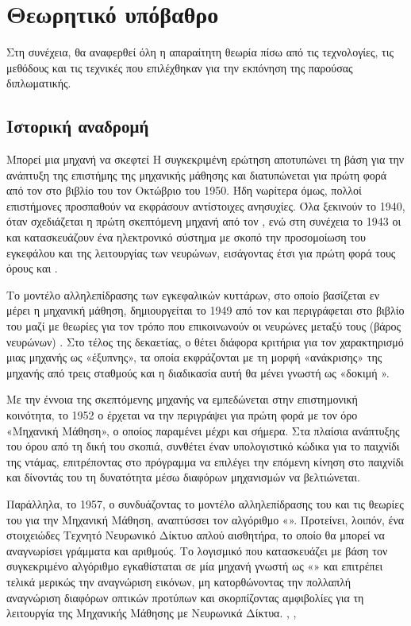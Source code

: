 \chapter{Θεωρητικό υπόβαθρο}

Στη συνέχεια, θα αναφερθεί όλη η απαραίτητη θεωρία πίσω από τις τεχνολογίες, τις μεθόδους και τις τεχνικές που επιλέχθηκαν για την εκπόνηση της παρούσας διπλωματικής.

\section{Ιστορική αναδρομή}	
Μπορεί μια μηχανή να σκεφτεί\en{;} Η συγκεκριμένη ερώτηση αποτυπώνει τη βάση για την ανάπτυξη της επιστήμης της μηχανικής μάθησης και διατυπώνεται για πρώτη φορά από τον  στο βιβλίο του  τον Οκτώβριο του 1950. \cite{3.1} Ήδη νωρίτερα όμως, πολλοί επιστήμονες προσπαθούν να εκφράσουν αντίστοιχες ανησυχίες. Όλα ξεκινούν το 1940, όταν σχεδιάζεται η πρώτη σκεπτόμενη μηχανή από τον , ενώ στη συνέχεια το 1943 οι  και  κατασκευάζουν ένα ηλεκτρονικό σύστημα με σκοπό την προσομοίωση του εγκεφάλου και της λειτουργίας των νευρώνων, εισάγοντας έτσι για πρώτη φορά τους όρους  και . \cite{3.2} 

Το μοντέλο αλληλεπίδρασης των εγκεφαλικών κυττάρων, στο οποίο βασίζεται εν μέρει η μηχανική μάθηση, δημιουργείται το 1949 από τον και περιγράφεται στο βιβλίο του  μαζί με θεωρίες για τον τρόπο που επικοινωνούν οι νευρώνες μεταξύ τους (βάρος νευρώνων) \cite{3.3}. Στο τέλος της δεκαετίας, ο  θέτει διάφορα κριτήρια για τον χαρακτηρισμό μιας μηχανής ως «έξυπνης», τα οποία εκφράζονται με τη μορφή «ανάκρισης» της μηχανής από τρεις σταθμούς και η διαδικασία αυτή θα μένει γνωστή ως «δοκιμή ». \cite{3.4}

Με την έννοια της σκεπτόμενης μηχανής να εμπεδώνεται στην επιστημονική κοινότητα, το 1952 ο  έρχεται να την περιγράψει για πρώτη φορά με τον όρο «Μηχανική Μάθηση», ο οποίος παραμένει μέχρι και σήμερα. Στα πλαίσια ανάπτυξης του όρου από  τη δική του σκοπιά, συνθέτει έναν υπολογιστικό κώδικα για το παιχνίδι της ντάμας, επιτρέποντας στο πρόγραμμα να επιλέγει την επόμενη κίνηση στο παιχνίδι και δίνοντάς του τη δυνατότητα μέσω διαφόρων μηχανισμών να βελτιώνεται. \cite{3.3} 

Παράλληλα, το 1957, ο  συνδυάζοντας το μοντέλο αλληλεπίδρασης του  και τις θεωρίες του  για την Μηχανική Μάθηση, αναπτύσσει τον αλγόριθμο «». Προτείνει, λοιπόν, ένα στοιχειώδες Τεχνητό Νευρωνικό Δίκτυο απλού αισθητήρα, το οποίο θα μπορεί να αναγνωρίσει γράμματα και αριθμούς. Το λογισμικό που κατασκευάζει με βάση τον συγκεκριμένο αλγόριθμο εγκαθίσταται σε μία μηχανή γνωστή ως «» και επιτρέπει τελικά μερικώς την αναγνώριση εικόνων, μη κατορθώνοντας την πολλαπλή αναγνώριση διαφόρων οπτικών προτύπων και σκορπίζοντας αμφιβολίες για τη λειτουργία της Μηχανικής Μάθησης με Νευρωνικά Δίκτυα. \cite{3.3}, \cite{3.5}, \cite{3.6} 

